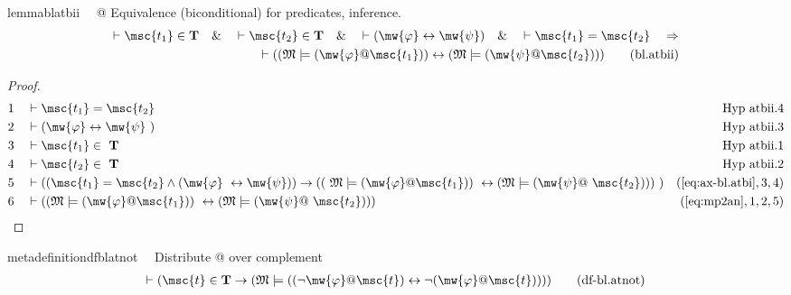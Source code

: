 \begin{restatable}{lemma}{blatbii}~~ @ Equivalence (biconditional) for
predicates, inference.
\begin{align}
\vdash \msc{t_1} \in \mathbf{T}\quad\&\quad \vdash \msc{t_2} \in
    \mathbf{T}\quad\&\quad \vdash ( \mw{\varphi} \leftrightarrow \mw{\psi}
    )\quad\&\quad \vdash \msc{t_1} = \msc{t_2}\quad\Rightarrow \notag \\ 
	\quad \vdash ( (
    \mathfrak{M} \models ( \mw{\varphi} @ \msc{t_1} ) ) \leftrightarrow (
    \mathfrak{M} \models ( \mw{\psi} @ \msc{t_2} ) )
    )\label{eq:bl.atbii}\tag{bl.atbii}
\end{align}
\end{restatable}

\begin{proof}
\begin{align}
  1 &&  & \vdash \msc{t_1} = \msc{t_2}&\text{Hyp~atbii.4}\notag%
  \\ 2 &&  & \vdash ( \mw{\varphi} \leftrightarrow \mw{\psi}
     ~)&\text{Hyp~atbii.3}\notag%
  \\ 3 &&  & \vdash \msc{t_1} \in
     ~\mathbf{T}&\text{Hyp~atbii.1}\notag%
  \\ 4 &&  & \vdash \msc{t_2} \in
     ~\mathbf{T}&\text{Hyp~atbii.2}\notag%
  \\ 5 &&  & \vdash ( ( \msc{t_1} = \msc{t_2} \wedge ( \mw{\varphi}
     ~\leftrightarrow \mw{\psi} ) ) \rightarrow ( (
     ~\mathfrak{M} \models ( \mw{\varphi} @ \msc{t_1} ) )
     ~\leftrightarrow ( \mathfrak{M} \models ( \mw{\psi} @
     ~\msc{t_2} ) ) )
     ~)&(\mbox{\ref{eq:ax-bl.atbi}},3,4)\notag
  \\ 6 &&  & \vdash ( ( \mathfrak{M} \models ( \mw{\varphi} @ \msc{t_1} ) )
     ~\leftrightarrow ( \mathfrak{M} \models ( \mw{\psi} @
     ~\msc{t_2} ) ) )&(\mbox{\ref{eq:mp2an}},1,2,5)\notag
\end{align}
\end{proof}

\begin{restatable}{metadefinition}{dfblatnot}~~ Distribute @ over complement
\begin{align}
\vdash ( \msc{t} \in \mathbf{T} \rightarrow ( \mathfrak{M} \models ( ( \lnot
    \mw{\varphi} @ \msc{t} ) \leftrightarrow \lnot ( \mw{\varphi} @ \msc{t} ) )
    ) )\label{eq:df-bl.atnot}\tag{df-bl.atnot}
\end{align}
\end{restatable}

